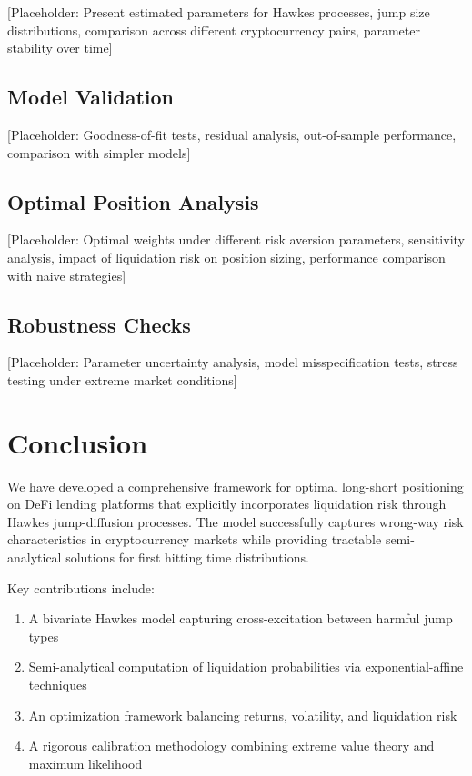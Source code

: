 \documentclass{article}
\theoremstyle{definition}
\begin{document}
[Placeholder: Present estimated parameters for Hawkes processes, jump size distributions, comparison across different cryptocurrency pairs, parameter stability over time]

\subsection{Model Validation}

[Placeholder: Goodness-of-fit tests, residual analysis, out-of-sample performance, comparison with simpler models]

\subsection{Optimal Position Analysis}

[Placeholder: Optimal weights under different risk aversion parameters, sensitivity analysis, impact of liquidation risk on position sizing, performance comparison with naive strategies]

\subsection{Robustness Checks}

[Placeholder: Parameter uncertainty analysis, model misspecification tests, stress testing under extreme market conditions]

\section{Conclusion}

We have developed a comprehensive framework for optimal long-short positioning on DeFi lending platforms that explicitly incorporates liquidation risk through Hawkes jump-diffusion processes. The model successfully captures wrong-way risk characteristics in cryptocurrency markets while providing tractable semi-analytical solutions for first hitting time distributions.

Key contributions include:
\begin{enumerate}
    \item A bivariate Hawkes model capturing cross-excitation between harmful jump types
    \item Semi-analytical computation of liquidation probabilities via exponential-affine techniques
    \item An optimization framework balancing returns, volatility, and liquidation risk
    \item A rigorous calibration methodology combining extreme value theory and maximum likelihood
\end{enumerate}
\end{document}
